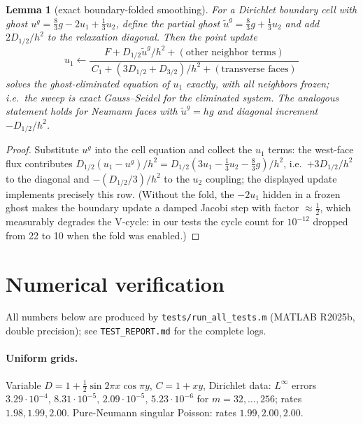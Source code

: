 \documentclass[11pt]{article}
\newtheorem{lemma}[theorem]{Lemma}
\theoremstyle{remark}
\begin{document}
\begin{lemma}[exact boundary-folded smoothing]\label{lem:fold}
For a Dirichlet boundary cell with ghost
$u^g=\tfrac83g-2u_1+\tfrac13u_2$, define the partial ghost
$\tilde u^g=\tfrac83 g+\tfrac13u_2$ and add $2D_{1/2}/h^2$ to the
relaxation diagonal.  Then the point update
\[
  u_1 \leftarrow
  \frac{F + D_{1/2}\tilde u^g/h^2 + (\text{other neighbor terms})}
       {\,C_1 + (3D_{1/2}+D_{3/2})/h^2 + (\text{transverse faces})\,}
\]
solves the ghost-eliminated equation of $u_1$ exactly, with all
neighbors frozen; i.e.\ the sweep is exact Gauss--Seidel for the
eliminated system.  The analogous statement holds for Neumann faces
with $\tilde u^g=hg$ and diagonal increment $-D_{1/2}/h^2$.
\end{lemma}

\begin{proof}
Substitute $u^g$ into the cell equation and collect the $u_1$ terms:
the west-face flux contributes
$D_{1/2}(u_1-u^g)/h^2=D_{1/2}(3u_1-\tfrac13u_2-\tfrac83g)/h^2$, i.e.\
$+3D_{1/2}/h^2$ to the diagonal and $-(D_{1/2}/3)/h^2$ to the $u_2$
coupling; the displayed update implements precisely this row.  (Without
the fold, the $-2u_1$ hidden in a frozen ghost makes the boundary update
a damped Jacobi step with factor $\approx\tfrac12$, which measurably
degrades the V-cycle: in our tests the cycle count for $10^{-12}$
dropped from 22 to 10 when the fold was enabled.)
\end{proof}

\section{Numerical verification}\label{sec:numerics}

All numbers below are produced by \texttt{tests/run\_all\_tests.m}
(MATLAB R2025b, double precision); see \texttt{TEST\_REPORT.md} for the
complete logs.

\paragraph{Uniform grids.}  Variable $D=1+\tfrac12\sin2\pi x\cos\pi y$,
$C=1+xy$, Dirichlet data: $L^\infty$ errors
$3.29\!\cdot\!10^{-4},\,8.31\!\cdot\!10^{-5},\,2.09\!\cdot\!10^{-5},\,
5.23\!\cdot\!10^{-6}$ for $m=32,\dots,256$; rates $1.98,1.99,2.00$.
Pure-Neumann singular Poisson: rates $1.99,2.00,2.00$.
\end{document}
